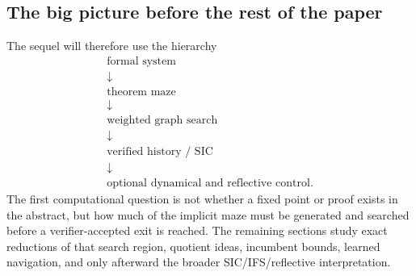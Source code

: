 \subsection{The big picture before the rest of the paper}
The sequel will therefore use the hierarchy
\[
\boxed{
\begin{array}{c}
\text{formal system}\\
\downarrow\\
\text{theorem maze}\\
\downarrow\\
\text{weighted graph search}\\
\downarrow\\
\text{verified history / SIC}\\
\downarrow\\
\text{optional dynamical and reflective control.}
\end{array}}
\]
The first computational question is not whether a fixed point or proof exists in the abstract, but how much of the implicit maze must be generated and searched before a verifier-accepted exit is reached. The remaining sections study exact reductions of that search region, quotient ideas, incumbent bounds, learned navigation, and only afterward the broader SIC/IFS/reflective interpretation.
